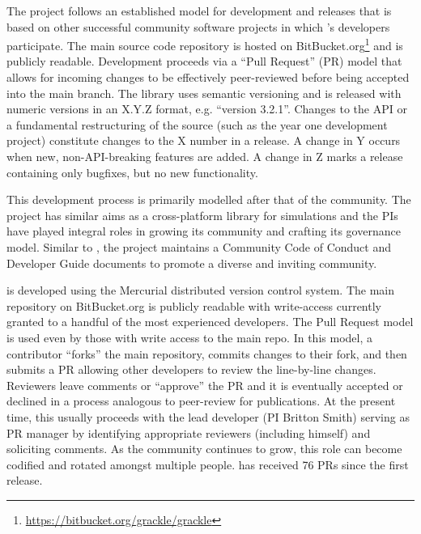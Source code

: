 The \grackle{} project follows an established model for development
and releases that is based on other successful community software
projects in which \grackle{}'s developers participate.  The main
source code repository is hosted on
BitBucket.org\footnote{\url{https://bitbucket.org/grackle/grackle}}
and is publicly readable.  Development proceeds via a ``Pull Request''
(PR) model that allows for incoming changes to be effectively
peer-reviewed before  being accepted into the main branch.  The
\grackle{} library uses semantic versioning and
is released with numeric versions in an X.Y.Z format, e.g. ``version
3.2.1''. Changes to the \grackle{} API or a fundamental restructuring
of the source (such as the year one development project) constitute
changes to the X number in a release.  A change in Y occurs when new,
non-API-breaking features are added.  A change in Z marks a release
containing only bugfixes, but no new functionality.

This development process is primarily modelled after that
of the \yt{} community.  The \yt{} project has similar
aims as a cross-platform library for simulations and the PIs have
played integral roles in growing 
its community and crafting its governance model.  Similar to
\yt{}, the \grackle{} project maintains a Community Code of
Conduct and Developer Guide documents to promote a diverse and
inviting community.

\grackle{} is developed using the Mercurial distributed version
control system.  The main repository on BitBucket.org is publicly
readable with write-access currently granted to a handful of the most
experienced developers.  The Pull Request model is used even by those
with write access to the main repo.  In this model, a contributor
``forks'' the main repository, commits changes to their fork, and then
submits a PR allowing other developers to review the
line-by-line changes.  Reviewers leave comments or ``approve'' the
PR and it is eventually accepted or declined in a process
analogous to peer-review for publications.  At the present time, this
usually proceeds with the lead developer (PI Britton Smith) serving as
PR manager by identifying appropriate reviewers (including
himself) and soliciting comments.  As the community continues to grow,
this role can become codified and rotated amongst multiple people.
\grackle{} has received 76 PRs since the first release.

